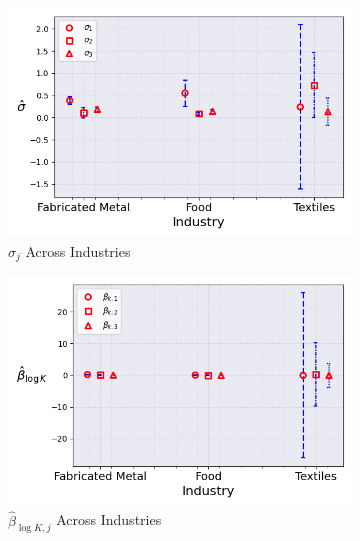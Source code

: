 \documentclass{article}
\begin{document}
\begin{figure}[ht!]
    \begin{subfigure}[t]{0.32\textwidth}
        \centering
        \includegraphics[width=\textwidth]{figure/stationary_mixture_kmshare_ciiu_sigma_across_industries_m3.png}
        \caption{$\hat\sigma_j$ Across Industries}
    \end{subfigure}
    \begin{subfigure}[t]{0.32\textwidth}
        \centering
        \includegraphics[width=\textwidth]{figure/stationary_mixture_kmshare_ciiu_beta_k_across_industries_m3.png}
        \caption{$\hat{\beta}_{\log K, j}$ Across Industries}
    \end{subfigure}
    \begin{subfigure}[t]{0.32\textwidth}
        \centering

\end{subfigure}
\end{figure}
\end{document}
